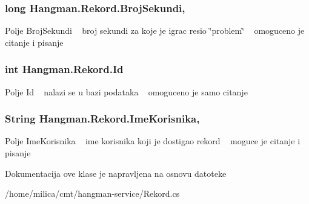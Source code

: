 \subsubsection[{Broj\+Sekundi}]{\setlength{\rightskip}{0pt plus 5cm}long Hangman.\+Rekord.\+Broj\+Sekundi\hspace{0.3cm}{\ttfamily [get]}, {\ttfamily [set]}}\label{classHangman_1_1Rekord_a2789776fa83a4ee6c5ecc64e0856abef}
Polje Broj\+Sekundi ~\newline
 broj sekundi za koje je igrac resio \char`\"{}problem\char`\"{} ~\newline
 omoguceno je citanje i pisanje \hypertarget{classHangman_1_1Rekord_a80a64fd7b7b6c5f239d5a218c1eb3312}{}
\subsubsection[{Id}]{\setlength{\rightskip}{0pt plus 5cm}int Hangman.\+Rekord.\+Id\hspace{0.3cm}{\ttfamily [get]}}\label{classHangman_1_1Rekord_a80a64fd7b7b6c5f239d5a218c1eb3312}
Polje Id ~\newline
 nalazi se u bazi podataka ~\newline
 omoguceno je samo citanje \hypertarget{classHangman_1_1Rekord_a2f7bebc6fd9da6c2b32a783edcfb1e5b}{}
\subsubsection[{Ime\+Korisnika}]{\setlength{\rightskip}{0pt plus 5cm}String Hangman.\+Rekord.\+Ime\+Korisnika\hspace{0.3cm}{\ttfamily [get]}, {\ttfamily [set]}}\label{classHangman_1_1Rekord_a2f7bebc6fd9da6c2b32a783edcfb1e5b}
Polje Ime\+Korisnika ~\newline
 ime korisnika koji je dostigao rekord ~\newline
 moguce je citanje i pisanje 

Dokumentacija ove klase je napravljena na osnovu datoteke \begin{DoxyCompactItemize}
\item 
/home/milica/cmt/hangman-\/service/Rekord.\+cs\end{DoxyCompactItemize}
